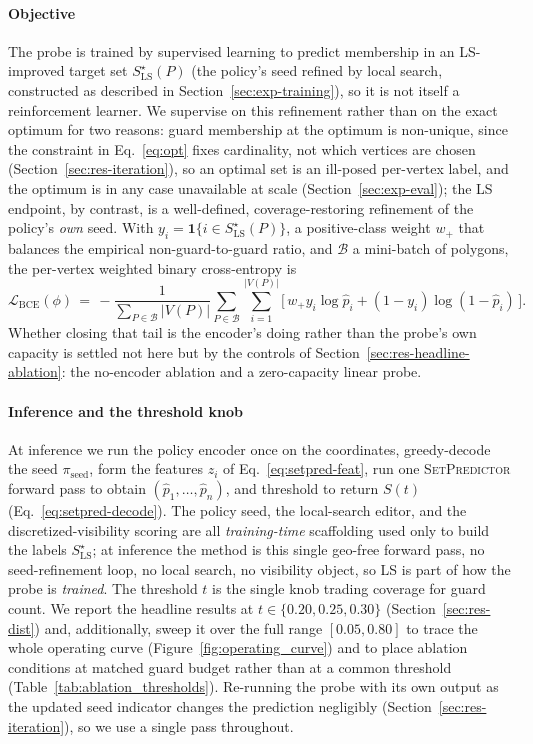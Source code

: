 \documentclass[11pt]{article}
\newcommand{\SetPredictor}{\textup{\textsc{SetPredictor}}}
\begin{document}
\paragraph{Objective} The probe is trained by supervised learning to predict membership in an LS-improved target set $S^\star_{\mathrm{LS}}(P)$ (the policy's seed refined by local search, constructed as described in Section~\ref{sec:exp-training}), so it is not itself a reinforcement learner. We supervise on this refinement rather than on the exact optimum for two reasons: guard membership at the optimum is non-unique, since the constraint in Eq.~\eqref{eq:opt} fixes cardinality, not which vertices are chosen (Section~\ref{sec:res-iteration}), so an optimal set is an ill-posed per-vertex label, and the optimum is in any case unavailable at scale (Section~\ref{sec:exp-eval}); the LS endpoint, by contrast, is a well-defined, coverage-restoring refinement of the policy's \emph{own} seed. With $y_i = \mathbf{1}\{i \in S^\star_{\mathrm{LS}}(P)\}$, a positive-class weight $w_{+}$ that balances the empirical non-guard-to-guard ratio, and $\mathcal{B}$ a mini-batch of polygons, the per-vertex weighted binary cross-entropy is
\begin{equation}
\mathcal{L}_{\mathrm{BCE}}(\phi) \,=\, -\frac{1}{\sum_{P \in \mathcal{B}} |V(P)|} \sum_{P \in \mathcal{B}} \sum_{i=1}^{|V(P)|} \big[\, w_{+} y_i \log \hat{p}_i + (1 - y_i) \log(1 - \hat{p}_i) \,\big].
\label{eq:setpred-loss}
\end{equation}
Whether closing that tail is the encoder's doing rather than the probe's own capacity is settled not here but by the controls of Section~\ref{sec:res-headline-ablation}: the no-encoder ablation and a zero-capacity linear probe.

\paragraph{Inference and the threshold knob} At inference we run the policy encoder once on the coordinates, greedy-decode the seed $\pi_{\mathrm{seed}}$, form the features $z_i$ of Eq.~\eqref{eq:setpred-feat}, run one \SetPredictor{} forward pass to obtain $(\hat{p}_1, \dots, \hat{p}_n)$, and threshold to return $S(t)$ (Eq.~\eqref{eq:setpred-decode}). The policy seed, the local-search editor, and the discretized-visibility scoring are all \emph{training-time} scaffolding used only to build the labels $S^\star_{\mathrm{LS}}$; at inference the method is this single geo-free forward pass, no seed-refinement loop, no local search, no visibility object, so LS is part of how the probe is \emph{trained}. The threshold $t$ is the single knob trading coverage for guard count. We report the headline results at $t \in \{0.20, 0.25, 0.30\}$ (Section~\ref{sec:res-dist}) and, additionally, sweep it over the full range $[0.05, 0.80]$  to trace the whole operating curve (Figure~\ref{fig:operating_curve}) and to place ablation conditions at matched guard budget rather than at a common threshold (Table~\ref{tab:ablation_thresholds}). Re-running the probe with its own output as the updated seed indicator changes the prediction negligibly (Section~\ref{sec:res-iteration}), so we use a single pass throughout.
\end{document}
